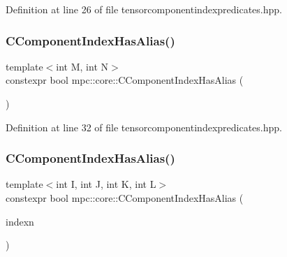 Definition at line 26 of file tensorcomponentindexpredicates.\+hpp.

\mbox{\label{namespacempc_1_1core_a9c341d33c82aa89108921c14b7ecf2ee}} 
\subsubsection{\texorpdfstring{C\+Component\+Index\+Has\+Alias()}{CComponentIndexHasAlias()}\hspace{0.1cm}{\footnotesize\ttfamily [2/4]}}
{\footnotesize\ttfamily template$<$int M, int N$>$ \\
constexpr bool mpc\+::core\+::\+C\+Component\+Index\+Has\+Alias (\begin{DoxyParamCaption}{ }\end{DoxyParamCaption})\hspace{0.3cm}{\ttfamily [inline]}}



Definition at line 32 of file tensorcomponentindexpredicates.\+hpp.

\mbox{\label{namespacempc_1_1core_a2242e766ecb8a4fabbedd7284d5df21f}} 
\subsubsection{\texorpdfstring{C\+Component\+Index\+Has\+Alias()}{CComponentIndexHasAlias()}\hspace{0.1cm}{\footnotesize\ttfamily [3/4]}}
{\footnotesize\ttfamily template$<$int I, int J, int K, int L$>$ \\
constexpr bool mpc\+::core\+::\+C\+Component\+Index\+Has\+Alias (\begin{DoxyParamCaption}\item[{const \mbox{\hyperlink{classmpc_1_1core_1_1_c_tensor_rank4_component_index}{mpc\+::core\+::\+C\+Tensor\+Rank4\+Component\+Index}}$<$ I, J, K, L $>$ \&}]{indexn }\end{DoxyParamCaption})\hspace{0.3cm}{\ttfamily [inline]}}



